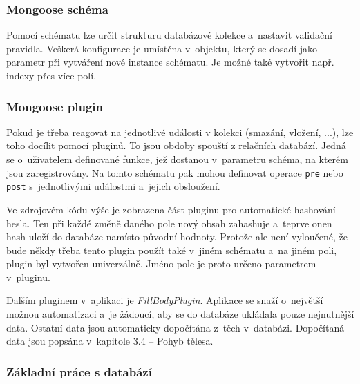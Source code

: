 \documentclass[a4paper,12pt]{article}
\def\code#1{\texttt{#1}}
\begin{document}


\vspace*{-0.5cm}
\subsubsection{Mongoose schéma}

Pomocí schématu lze určit strukturu databázové kolekce a~nastavit validační pravidla. Veškerá konfigurace je umístěna v~objektu, který se dosadí jako parametr při vytváření nové instance schématu. Je možné také vytvořit např. indexy přes více polí.~\cite{nodebook}



\vspace*{-0.5cm}
\subsubsection{Mongoose plugin}

Pokud je třeba reagovat na jednotlivé události v kolekci (smazání, vložení, ...), lze toho docílit pomocí pluginů. To jsou obdoby spouští z relačních databází. Jedná se o~uživatelem definované funkce, jež dostanou v~parametru schéma, na kterém jsou zaregistrovány. Na tomto schématu pak mohou definovat operace \code{pre} nebo \code{post} s~jednotlivými událostmi a~jejich obsloužení.~\cite{nodebook}



Ve zdrojovém kódu výše je zobrazena část pluginu pro automatické hashování hesla. Ten při každé změně daného pole nový obsah zahashuje a~teprve onen hash uloží do databáze namísto původní hodnoty. Protože ale není vyloučené, že bude někdy třeba tento plugin použít také v~jiném schématu a~na jiném poli, plugin byl vytvořen univerzálně. Jméno pole je proto určeno parametrem v~pluginu.

Dalším pluginem v~aplikaci je \textit{FillBodyPlugin}. Aplikace se snaží o~největší možnou automatizaci a~je žádoucí, aby se do databáze ukládala pouze nejnutnější data. Ostatní data jsou automaticky dopočítána z~těch v~databázi. Dopočítaná data jsou popsána v~kapitole 3.4 -- Pohyb tělesa.

\subsubsection{Základní práce s databází}
\end{document}
